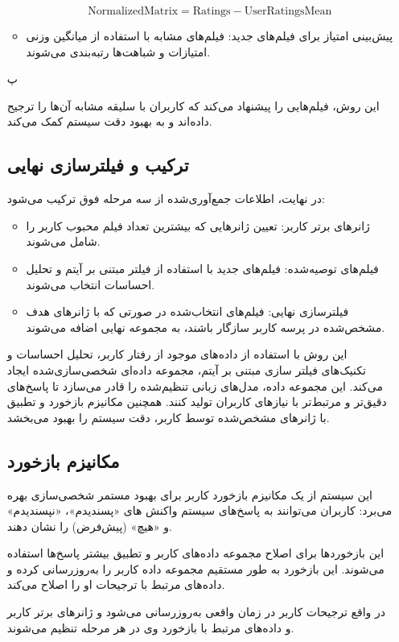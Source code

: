 \begin{enumerate}
\begin{itemize}
 
\begin{equation}
	\label{eq:NormalizedMatrix}
	\text{NormalizedMatrix} = \text{Ratings} - \text{UserRatingsMean}
\end{equation}

\item
پیش‌بینی امتیاز برای فیلم‌های جدید: فیلم‌های مشابه با استفاده از میانگین وزنی امتیازات و شباهت‌ها رتبه‌بندی می‌شوند.
\end{itemize}
پ

این روش، فیلم‌هایی را پیشنهاد می‌کند که کاربران با سلیقه مشابه آن‌ها را ترجیح داده‌اند و به بهبود دقت سیستم کمک می‌کند.

\subsection{ترکیب و فیلترسازی نهایی}
در نهایت، اطلاعات جمع‌آوری‌شده از سه مرحله فوق ترکیب می‌شود:
\begin{itemize}
\item
ژانرهای برتر کاربر: تعیین ژانرهایی که بیشترین تعداد فیلم محبوب کاربر را شامل می‌شوند.
\item
فیلم‌های توصیه‌شده:  فیلم‌های جدید با استفاده از فیلتر مبتنی بر آیتم و تحلیل احساسات انتخاب می‌شوند.
\item
فیلترسازی نهایی: فیلم‌های انتخاب‌شده در صورتی که با ژانرهای هدف مشخص‌شده در پرسه کاربر سازگار باشند، به مجموعه نهایی اضافه می‌شوند.
\end{itemize}

این روش با استفاده از داده‌های موجود از رفتار کاربر، تحلیل احساسات و تکنیک‌های فیلتر سازی مبتنی بر آیتم، مجموعه داده‌ای شخصی‌سازی‌شده ایجاد می‌کند. این مجموعه داده، مدل‌های زبانی تنظیم‌شده را قادر می‌سازد تا پاسخ‌های دقیق‌تر و مرتبط‌تر با نیازهای کاربران تولید کنند. همچنین مکانیزم بازخورد و تطبیق با ژانرهای مشخص‌شده توسط کاربر، دقت سیستم را بهبود می‌بخشد.

\subsection{مکانیزم بازخورد}
این سیستم از یک مکانیزم بازخورد کاربر برای بهبود مستمر شخصی‌سازی بهره می‌برد:
کاربران می‌توانند به پاسخ‌های سیستم واکنش های «پسندیدم»، «نپسندیدم» و «هیچ» (پیش‌فرض) را نشان دهند.


این بازخورد‌ها برای اصلاح مجموعه داده‌های کاربر و تطبیق بیشتر پاسخ‌ها استفاده می‌شوند.
این بازخورد به طور مستقیم مجموعه داده کاربر را به‌روزرسانی کرده و داده‌های مرتبط با ترجیحات او را اصلاح می‌کند.


در واقع ترجیحات کاربر در زمان واقعی به‌روزرسانی می‌شود و ژانرهای برتر کاربر و داده‌های مرتبط با بازخورد وی در هر مرحله تنظیم می‌شوند.



\end{enumerate}
